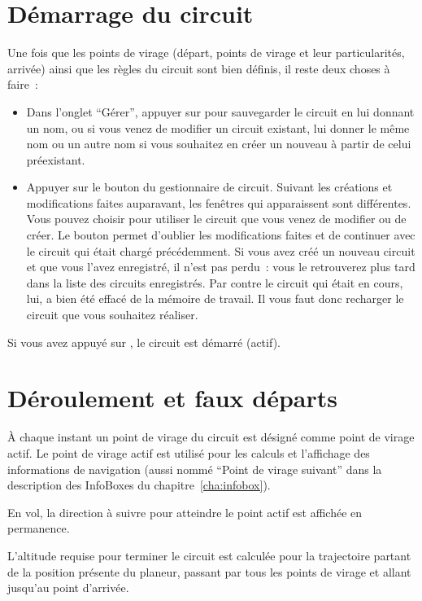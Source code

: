 \section{Démarrage du circuit}\label{sec:start-task}
Une fois que les points de virage (départ, points de virage et leur particularités, arrivée) ainsi que les règles du circuit sont bien définis, il reste deux choses à faire~:
\begin{itemize}
\item Dans l'onglet ``Gérer'', appuyer sur  pour sauvegarder le circuit en lui donnant un nom, ou si vous venez de modifier un circuit existant, lui donner le même nom ou un autre nom si vous souhaitez en créer un nouveau à partir de celui préexistant.
\item Appuyer sur le bouton  du gestionnaire de circuit.
Suivant les créations et modifications faites auparavant, les fenêtres qui apparaissent sont différentes.
Vous pouvez choisir  pour utiliser le circuit que vous venez de modifier ou de créer.
Le bouton  permet d'oublier les modifications faites et de continuer avec le circuit qui était chargé précédemment.
Si vous avez créé un nouveau circuit et que vous l'avez enregistré, il n'est pas perdu~: vous le retrouverez plus tard dans la liste des circuits enregistrés.
Par contre le circuit qui était en cours, lui, a bien été effacé de la mémoire de travail.
Il vous faut donc recharger le circuit que vous souhaitez réaliser.
\end{itemize}
Si vous avez appuyé sur , le circuit est démarré (actif).

\section{Déroulement et faux départs}\label{sec:advanc-rest-tasks}
À chaque instant un point de virage du circuit est désigné comme point de virage
actif. Le point de virage actif est utilisé pour les calculs et l'affichage des
informations de navigation (aussi nommé ``Point de virage suivant'' dans la
description des InfoBoxes du chapitre~\ref{cha:infobox}).

En vol, la direction à suivre pour atteindre le point actif est affichée en permanence.

L'altitude requise pour terminer le circuit est calculée pour la trajectoire partant
de la position présente du planeur, passant par tous les points de virage et allant
jusqu'au point d'arrivée.

